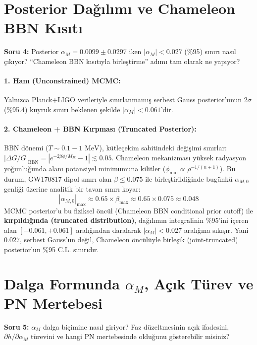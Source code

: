 \documentclass[11pt,a4paper]{article}
\begin{document}
\section{Posterior Dağılımı ve Chameleon BBN Kısıtı}

\begin{questionbox}
\textbf{Soru 4:} Posterior $\alpha_M = 0.0099 \pm 0.0297$ iken $|\alpha_M| < 0.027$ (\%95) sınırı nasıl çıkıyor? “Chameleon BBN kısıtıyla birleştirme” adımı tam olarak ne yapıyor?
\end{questionbox}

\paragraph{1. Ham (Unconstrained) MCMC:}
Yalnızca Planck+LIGO verileriyle sınırlanmamış serbest Gauss posterior'unun $2\sigma$ (\%95.4) kuyruk sınırı beklenen şekilde $|\alpha_M| < 0.061$'dir.

\paragraph{2. Chameleon + BBN Kırpması (Truncated Posterior):}
BBN dönemi ($T \sim 0.1 - 1\text{ MeV}$), kütleçekim sabitindeki değişimi sınırlar: $|\Delta G/G|_{\text{BBN}} = |e^{-2\beta\phi/M_{Pl}} - 1| \lesssim 0.05$. Chameleon mekanizması yüksek radyasyon yoğunluğunda alanı potansiyel minimumuna kilitler ($\phi_{\min} \propto \rho^{-1/(n+1)}$). Bu durum, GW170817 dipol sınırı olan $\beta \le 0.075$ ile birleştirildiğinde bugünkü $\alpha_{M,0}$ genliği üzerine analitik bir tavan sınırı koyar:
\begin{equation}
|\alpha_{M,0}|_{\max} \approx 0.65 \times \beta_{\max} \approx 0.65 \times 0.075 \approx 0.048
\end{equation}
MCMC posterior'u bu fiziksel öncül (Chameleon BBN conditional prior cutoff) ile \textbf{kırpıldığında (truncated distribution)}, dağılımın integralinin \%95'ini içeren alan $[-0.061, +0.061]$ aralığından daralarak \textbf{$|\alpha_M| < 0.027$} aralığına sıkışır. Yani $0.027$, serbest Gauss'un değil, Chameleon öncülüyle birleşik (joint-truncated) posterior'un \%95 C.L. sınırıdır.

\section{Dalga Formunda $\alpha_M$, Açık Türev ve PN Mertebesi}

\begin{questionbox}
\textbf{Soru 5:} $\alpha_M$ dalga biçimine nasıl giriyor? Faz düzeltmesinin açık ifadesini, $\partial h/\partial\alpha_M$ türevini ve hangi PN mertebesinde olduğunu gösterebilir misiniz?
\end{questionbox}
\end{document}
